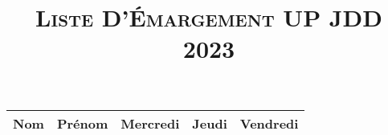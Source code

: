 \documentclass[13pt, french, a4paper]{article}
\title{\textsc{Liste D'Émargement UP JDD 2023}}
\date{\vspace{-10ex}}
\begin{document}
\maketitle

\begin{longtable}{|p{5cm}|p{4cm}|p{2cm}|p{2cm}|p{2cm}|}
    \hline
    \Large \textbf{Nom} & \Large \textbf{Prénom} & \large \textbf{Mercredi} &  \large \textbf{Jeudi} & \large \textbf{Vendredi} \\
    \hline
    
\end{longtable}
\end{document}
